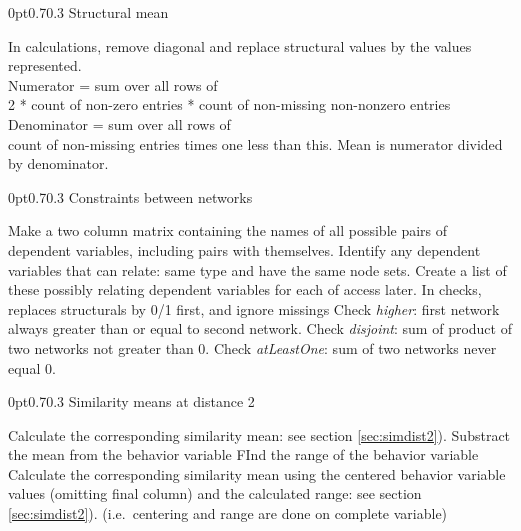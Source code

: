\documentclass[12pt,a4paper]{article}
\makeatletter
\renewcommand{\=}{\,=\,}
\newcommand{\+}{\,+\,}
\renewcommand{\subsection}{\@startsection{subsection}{2}
                {0pt}{0.7\baselineskip}{0.3\baselineskip}
                {\sffamily} }
\makeatother
\begin{document}
\subsection{Structural  mean}
\label{sec:structmean}
\begin{algorithmic}
\STATE In calculations, remove diagonal and replace structural values by the
values represented.\\
\STATE Numerator = sum over all rows of\\
2 * count of non-zero entries * count of non-missing non-nonzero entries\\
\STATE Denominator = sum over all rows of \\
count of non-missing entries times one less than this.
\STATE Mean is numerator divided by denominator.
\end{algorithmic}
\subsection{Constraints between networks}
\label{sec:constraints}
\begin{algorithmic}
\STATE Make a two column matrix containing the names of all possible pairs of
dependent variables, including pairs with themselves.
\STATE Identify any dependent variables that can relate: same type and have the
same node sets.
\STATE Create a list of these possibly relating dependent variables for each of
access later.
\STATE In checks, replaces structurals by 0/1 first, and ignore missings
\STATE Check \emph{higher}: first network always greater than or equal to second
network.
\STATE Check \emph{disjoint}: sum of product of two networks not greater than 0.
\STATE Check \emph{atLeastOne}: sum of two networks never equal 0.
\ENDIF
\ENDFOR
\end{algorithmic}
\subsection{Similarity means at distance 2}
\label{sec:covarDist2}
\begin{algorithmic}
\STATE Calculate the corresponding similarity mean: see section
\ref{sec:simdist2}).
\ENDFOR
\ENDFOR
{}
\STATE Substract the mean from the behavior variable
\STATE FInd the range of the behavior variable
\STATE Calculate the corresponding similarity mean using the centered behavior
variable values (omitting final column) and the calculated range: see section
\ref{sec:simdist2}).
(i.e.\ centering and range are done on complete variable)
\ENDFOR
\ENDFOR
\end{algorithmic}
\end{document}
